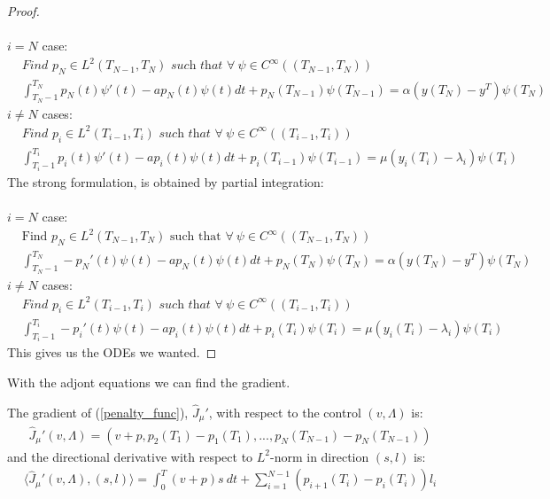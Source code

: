 \begin{proof}
\\
\\
$i=N$ case:
\begin{align*}
&\textit{Find $p_N \in L^2(T_{N-1},T_N)$ such that }\forall \ \psi \in C^{\infty}((T_{N-1},T_N)) \\
&\int_{T_N-1}^{T_N}p_N(t)\psi'(t)-a p_N(t)\psi(t)dt +p_N(T_{N-1})\psi(T_{N-1})
= \alpha(y(T_N)-y^T)\psi(T_N)\ 
\end{align*}
$i\neq N$ cases:
\begin{align*}
&\textit{Find $p_i \in L^2(T_{i-1},T_i)$ such that }\forall \ \psi \in C^{\infty}((T_{i-1},T_i))\\
&\int_{T_i-1}^{T_i}p_i(t)\psi'(t)-a p_i(t)\psi(t)dt +p_i(T_{i-1})\psi(T_{i-1})
= \mu(y_{i}(T_i)-\lambda_i )\psi(T_i) \ 
\end{align*}
The strong formulation, is obtained by partial integration:
\\
\\
 $i=N$ case:
\begin{align*}
&\textrm{Find $p_N \in L^2(T_{N-1},T_N)$ such that }\forall \ \psi \in C^{\infty}((T_{N-1},T_N)) \\
&\int_{T_N-1}^{T_N}-p_N'(t)\psi(t)-a p_N(t)\psi(t)dt +p_N(T_{N})\psi(T_{N})
= \alpha(y(T_N)-y^T)\psi(T_N)\ 
\end{align*}
$i\neq N$ cases:
\begin{align*}
&\textit{Find $p_i \in L^2(T_{i-1},T_i)$ such that }\forall \ \psi \in C^{\infty}((T_{i-1},T_i))\\
&\int_{T_i-1}^{T_i}-p_i'(t)\psi(t)-a p_i(t)\psi(t)dt +p_i(T_{i})\psi(T_{i})
= \mu(y_{i}(T_i)-\lambda_i )\psi(T_i) \ 
\end{align*}
This gives us the ODEs we wanted.
\end{proof}
With the adjont equations we can find the gradient.
\begin{theorem}
The gradient of (\ref{penalty_func}), $\hat J_{\mu}'$, with respect to the control $(v,\Lambda)$ is:
\begin{align}
\hat J_{\mu}'(v,\Lambda) = (v+p,p_{2}(T_1) -p_{1}(T_1),..., p_{N}(T_{N-1}) -p_{N}(T_{N-1})) \label{penalty grad}
\end{align} 
and the directional derivative with respect to $L^2$-norm in direction $(s,l)$ is:
\begin{align*}
\langle \hat J_{\mu}'(v,\Lambda), (s,l)\rangle = \int_0^T (v+p)s \ dt +\sum_{i=1}^{N-1}(p_{i+1}(T_i) -p_{i}(T_i) )l_i
\end{align*}
\end{theorem}
